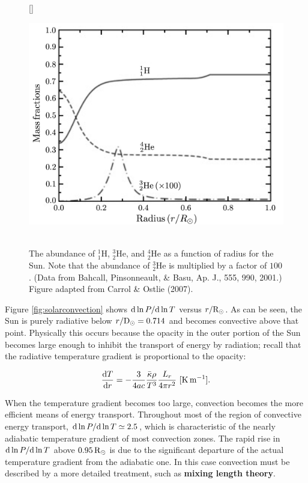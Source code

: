 \documentclass[a4paper,10pt]{article}
\begin{document}
\begin{figure}[h]
    [\FBwidth]
    {\caption{\footnotesize{\\The abundance of $^1_1$H, $^3_2$He, and $^4_2$He as a function of radius for the Sun. Note that the abundance of $^3_2$He is multiplied by a factor of $100$. (Data from Bahcall, Pinsonneault, \& Basu, Ap. J., 555, 990, 2001.) Figure adapted from Carrol \& Ostlie (2007).}}
    \label{fig:massfracrad}}
    {\includegraphics[width=12cm]{figures/MassFractionRadius.png}}
\end{figure}

{\noindent}Figure \ref{fig:solarconvection} shows ${\rm d}\ln P/{\rm d}\ln T$ versus $r/{\rm R_\odot}$. As can be seen, the Sun is purely radiative below $r/{\rm D_\odot}=0.714$ and becomes convective above that point. Physically this occurs because the opacity in the outer portion of the Sun becomes large enough to inhibit the transport of energy by radiation; recall that the radiative temperature gradient is proportional to the opacity:

\begin{align*}
    \frac{{\rm d}T}{{\rm d}r} = -\frac{3}{4ac}\frac{\bar{\kappa}\rho}{T^3}\frac{L_r}{4\pi r^2} ~ [{\rm K\,m^{-1}}].
\end{align*}

{\noindent}When the temperature gradient becomes too large, convection becomes the more efficient means of energy transport. Throughout most of the region of convective energy transport, ${\rm d}\ln P/{\rm d}\ln T\simeq2.5$, which is characteristic of the nearly adiabatic temperature gradient of most convection zones. The rapid rise in ${\rm d}\ln P/{\rm d}\ln T$ above $0.95\,{\rm R_\odot}$ is due to the significant departure of the actual temperature gradient from the adiabatic one. In this case convection must be described by a more detailed treatment, such as \textbf{mixing length theory}.
\end{document}
